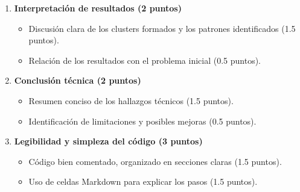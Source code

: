 \documentclass[a4,11pt]{aleph-notas}
\begin{document}
\begin{enumerate}[leftmargin=*,label=\textbf{\arabic*.}]
    \item \textbf{Interpretación de resultados (2 puntos)}
    \begin{itemize}[leftmargin=*]
        \item Discusión clara de los clusters formados y los patrones identificados (1.5 puntos).
        \item Relación de los resultados con el problema inicial (0.5 puntos).
    \end{itemize}
    
    \item \textbf{Conclusión técnica (2 puntos)}
    \begin{itemize}[leftmargin=*]
        \item Resumen conciso de los hallazgos técnicos (1.5 puntos).
        \item Identificación de limitaciones y posibles mejoras (0.5 puntos).
    \end{itemize}
    
    \item \textbf{Legibilidad y simpleza del código (3 puntos)}
    \begin{itemize}[leftmargin=*]
        \item Código bien comentado, organizado en secciones claras (1.5 puntos).
        \item Uso de celdas Markdown para explicar los pasos (1.5 puntos).
    \end{itemize}
\end{enumerate}
\end{document}
